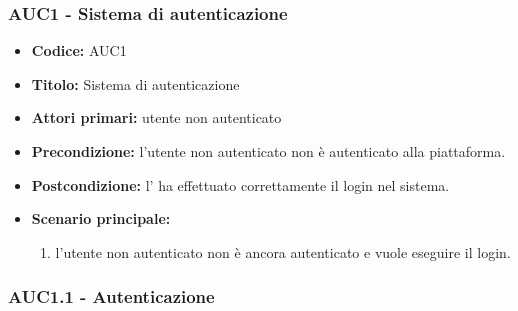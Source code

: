 \documentclass[casi-duso]{subfiles}
\begin{document}
\subsubsection{AUC1 - Sistema di autenticazione}%
\label{subsub:AUC1}

\begin{itemize}
  \item \textbf{Codice:} AUC1
  \item \textbf{Titolo:} Sistema di autenticazione
  \item \textbf{Attori primari:} utente non autenticato
  \item \textbf{Precondizione:} l'utente non autenticato non è autenticato alla piattaforma.
  \item \textbf{Postcondizione:} l' ha effettuato correttamente il login nel sistema.
  \item \textbf{Scenario principale:}
  \begin{enumerate}
    \item l'utente non autenticato non è ancora autenticato e vuole eseguire il login.
  \end{enumerate}
\end{itemize}

\subsubsection{AUC1.1 - Autenticazione}%
\label{subsub:AUC1.1}
\end{document}
